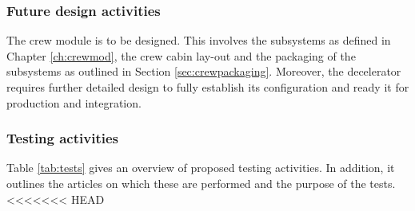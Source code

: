 \subsubsection{Future design activities}
The crew module is to be designed. This involves the subsystems as defined in Chapter \ref{ch:crewmod}, the crew cabin lay-out and the packaging of the subsystems as outlined in Section \ref{sec:crewpackaging}. Moreover, the decelerator requires further detailed design to fully establish its configuration and ready it for production and integration. 

\subsubsection{Testing activities} \label{sec:TestAct}
Table \ref{tab:tests} gives an overview of proposed testing activities. In addition, it outlines the articles on which these are performed and the purpose of the tests.
<<<<<<< HEAD
